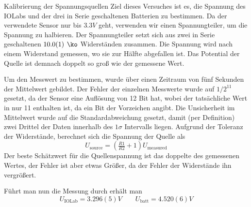 \documentclass{alex_gp}
\begin{document}
\begin{mybox}{Kalibrierung der Spannungsquellen}
	Ziel dieses Versuches ist es, die Spannung des IOLabs und der drei in Serie geschaltenen Batterien zu bestimmen. Da der verwendete Sensor nur bis \( 3.3 \unit{V} \) geht, verwenden wir einen Spannungteiler, um die Spannung zu halbieren. Der Spannungteiler setzt sich aus zwei in Serie geschaltenen \( 10.0(1) \unit{\ko} \) Widerständen zusammen. Die Spannung wird nach einem Widerstand gemessen, wo sie zur Hälfte abgefallen ist. Das Potential der Quelle ist demnach doppelt so groß wie der gemessene Wert.
	
	Um den Messwert zu bestimmen, wurde über einen Zeitraum von fünf Sekunden der Mittelwert gebildet. Der Fehler der einzelnen Messwerte wurde auf \( 1/2^{11} \) gesetzt, da der Sensor eine Auflösung von 12 Bit hat, wobei der tatsächliche Wert in nur 11 enthalten ist, da ein Bit der Vorzeichen angibt. Die Unsicherheit im Mittelwert wurde auf die Standardabweichung gesetzt, damit (per Definition) zwei Drittel der Daten innerhalb des \( 1\sigma \) Intervalls liegen. Aufgrund der Toleranz der Widerstände, berechnet sich die Spannung der Quelle als
	\begin{equation}\label{eqn:1}
		U_{\text{source}} = \left(\tfrac{R1}{R2} + 1\right) U_{\text{measured}}
	\end{equation}
	Der beste Schätzwert für die Quellenspannung ist das doppelte des gemessenen Wertes, der Fehler ist aber etwas Größer, da der Fehler der Widerstände ihn vergrößert.
	
	Führt man nun die Messung durch erhält man 
	\begin{equation}\label{key}
		U_{\text{IOLab}} = 3.296(5) \unit{V} \qquad U_{\text{batt}} = 4.520(6) \unit{V} 
	\end{equation}
\end{mybox}
\end{document}
